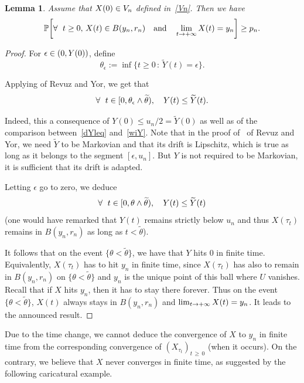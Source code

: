 \documentclass[10pt]{amsart}
\newtheorem{lemm}[theo]{Lemma}\newtheorem{prop}[theo]{Proposition}\newtheorem{coro}[theo]{Corollary}\newtheorem{conj}[theo]{Conjecture}
\theoremstyle{definition}\newtheorem{defi}[theo]{Definition}\newtheorem{rema}[theo]{Remark}\newtheorem{exam}[theo]{Example}\newtheorem{exem}[theo]{Example}\newtheorem{nota}[theo]{Notation}
\newcommand{\PP}{\mathbb{P}}
\newcommand{\iy}{\infty}
\newcommand{\wi}{\widetilde}
\newcommand{\fo}{\forall\ }
\let\originalleft\left
\let\originalright\right
\renewcommand{\left}{\mathopen{}\mathclose\bgroup\originalleft}
\renewcommand{\right}{\aftergroup\egroup\originalright}
\let\oldin\in
\renewcommand{\in}{\mathchoice{\oldin}{\oldin}{\,\oldin\,}{\,\oldin\,}}
\renewcommand*{\to}{\mathchoice{\longrightarrow}{\rightarrow}{\rightarrow}{\rightarrow}}
\let\oldforall\forall
\renewcommand*{\forall}{\mathrel{\oldforall}}
\begin{document}
\begin{lemm}\label{fini}
Assume that $X(0)\in V_n$ defined in~\eqref{Vn}. Then we have
\begin{equation*}
\PP\left[\fo t\geq 0,\, X(t)\in B(y_n,r_n)\quad\text{and}\quad \lim_{t\to +\iy} X(t)=y_n\right] \geq p_n.
\end{equation*}
\end{lemm}
\begin{proof}
For $\epsilon \in(0, Y(0))$, define
\begin{equation*}
\theta_\epsilon := \inf\{t\geq 0\,:\, \wi Y(t)=\epsilon\}.
\end{equation*}


Applying \cite[Theorem~3.7]{MR1725357} of Revuz and Yor, we get that
\begin{equation*}
\fo t\in[0, \theta_\epsilon\wedge \wi\theta),\quad Y(t) \leq \wi Y(t).
\end{equation*}


Indeed, this a consequence of $Y(0)\leq u_n/2=\wi Y(0)$ as well as of the comparison between~\eqref{dYleq} and~\eqref{wiY}. Note that in the proof of~\cite[Theorem~(3.7)]{MR1725357} of Revuz and Yor, we need $\wi Y$ to be Markovian and that its drift is Lipschitz, which is true as long as it belongs to the segment $[\epsilon, u_n]$. But $Y$ is not required to be Markovian, it is sufficient that its drift is adapted.


Letting $\epsilon$ go to zero, we deduce
\begin{equation*}
\fo t\in[0, \theta\wedge \wi\theta),\quad Y(t) \leq \wi Y(t)
\end{equation*}
(one would have remarked that $Y(t)$ remains strictly below $u_n$ and thus $X(\tau_t)$ remains in $B(y_n,r_n)$ as long as $t< \wi \theta$).


It follows that on the event $\{\theta<\wi\theta\}$, we have that $Y$ hits 0 in finite time. Equivalently, $X(\tau_t)$ has to hit $y_n$ in finite time, since $X(\tau_t)$ has also to remain in $B(y_n,r_n)$ on $\{\theta<\wi\theta\}$ and $y_n$ is the unique point of this ball where $U$ vanishes. Recall that if $X$ hits $y_n$, then it has to stay there forever. Thus on the event $\{\theta<\wi\theta\}$, $X(t)$ always stays in $ B(y_n,r_n)$ and $\lim_{t\to +\iy}X(t)=y_n$. It leads to the announced result.
\end{proof}


Due to the time change, we cannot deduce the convergence of $X$ to $y_n$ in finite time from the corresponding convergence of $(X_{\tau_t})_{t\,\geq\,0}$ (when it occurs). On the contrary, we believe that $X$ never converges in finite time, as suggested by the following caricatural example.
\end{document}

